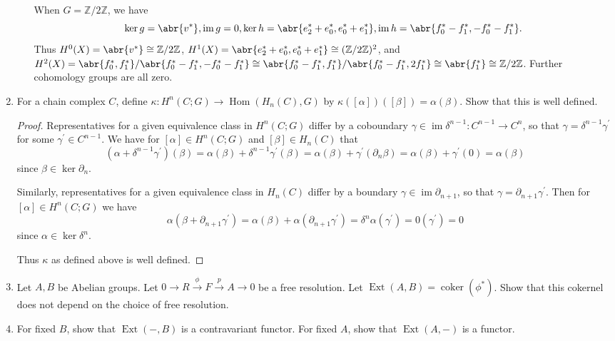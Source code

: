 \documentclass[11pt]{article}
\DeclareMathOperator{\im}{im}
\DeclareMathOperator{\coker}{coker}
\DeclareMathOperator{\Hom}{Hom}
\DeclareMathOperator{\Ext}{Ext}
\begin{document}
\begin{enumerate}
\begin{enumerate}
        When $G = \mathbb{Z}/2\mathbb{Z}$, we have \[\ker g = \abr{v^\ast}, \im g = 0, \ker h = \abr{e_2^\ast+e_0^\ast,e_0^\ast+e_1^\ast}, \im h = \abr{f_0^\ast-f_1^\ast, -f_0^\ast-f_1^\ast}.\] Thus $H^0(X) = \abr{v^\ast}\cong \mathbb{Z}/2\mathbb{Z}$, $H^1(X) = \abr{e_2^\ast+e_0^\ast,e_0^\ast+e_1^\ast} \cong (\mathbb{Z}/2\mathbb{Z})^2$, and $H^2(X) = \abr{f_0^\ast, f_1^\ast}/\abr{f_0^\ast-f_1^\ast, -f_0^\ast-f_1^\ast} \cong \abr{f_0^\ast-f_1^\ast, f_1^\ast}/\abr{f_0^\ast-f_1^\ast,2f_1^\ast}\cong \abr{f_1^\ast}\cong \mathbb{Z}/2\mathbb{Z}$. Further cohomology groups are all zero.
    \end{enumerate}
    \item For a chain complex $C$, define $\kappa : H^n(C; G) \to \Hom(H_n(C),G)$ by $\kappa([\alpha])([\beta]) = \alpha(\beta)$. Show that this is well defined. \begin{proof}
      Representatives for a given equivalence class in $H^n(C; G)$ differ by a coboundary $\gamma\in \im \delta^{n-1}\colon C^{n-1}\to C^n$, so that $\gamma = \delta^{n-1}\gamma^\prime$ for some $\gamma^\prime\in C^{n-1}$. We have for $[\alpha]\in H^n(C;G)$ and $[\beta]\in H_n(C)$ that \[(\alpha + \delta^{n-1}\gamma^\prime)(\beta) = \alpha(\beta) + \delta^{n-1}\gamma^\prime(\beta) = \alpha(\beta) + \gamma^\prime(\partial_n\beta) = \alpha(\beta) + \gamma^\prime(0) = \alpha(\beta)\] since $\beta\in \ker \partial_n$.

      Similarly, representatives for a given equivalence class in $H_n(C)$ differ by a boundary $\gamma \in \im \partial_{n+1}$, so that $\gamma = \partial_{n+1}\gamma^\prime$. Then for $[\alpha]\in H^n(C;G)$ we have \[\alpha(\beta + \partial_{n+1}\gamma^\prime) = \alpha(\beta) + \alpha(\partial_{n+1}\gamma^\prime) = \delta^n\alpha(\gamma^\prime) = 0(\gamma^\prime) = 0\] since $\alpha\in \ker \delta^n$.

      Thus $\kappa$ as defined above is well defined.
    \end{proof}
    \item Let $A,B$ be Abelian groups. Let $0 \to R \xrightarrow{\phi} F \xrightarrow{p} A \to 0$ be a free resolution. Let $\Ext(A,B) = \coker(\phi^\ast)$. Show that this cokernel does not depend on the choice of free resolution.
    \item For fixed $B$, show that $\Ext(-,B)$ is a contravariant functor. For fixed $A$, show that $\Ext(A,-)$ is a functor.
\end{enumerate}
\end{document}

